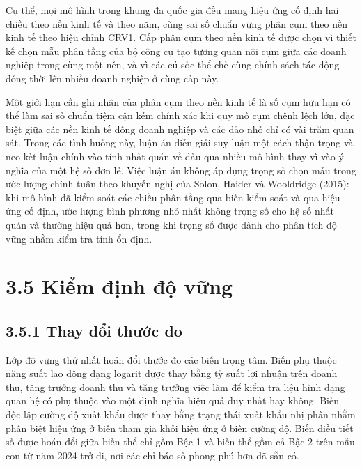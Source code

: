 \documentclass[
  a4paper,
  13pt]{extreport}
\begin{document}
Cụ thể, mọi mô hình trong khung đa quốc gia đều mang hiệu ứng cố định
hai chiều theo nền kinh tế và theo năm, cùng sai số chuẩn vững phân cụm
theo nền kinh tế theo hiệu chỉnh CRV1. Cấp phân cụm theo nền kinh tế
được chọn vì thiết kế chọn mẫu phân tầng của bộ công cụ tạo tương quan
nội cụm giữa các doanh nghiệp trong cùng một nền, và vì các cú sốc thể
chế cùng chính sách tác động đồng thời lên nhiều doanh nghiệp ở cùng cấp
này.

Một giới hạn cần ghi nhận của phân cụm theo nền kinh tế là số cụm hữu
hạn có thể làm sai số chuẩn tiệm cận kém chính xác khi quy mô cụm chênh
lệch lớn, đặc biệt giữa các nền kinh tế đông doanh nghiệp và các đảo nhỏ
chỉ có vài trăm quan sát. Trong các tình huống này, luận án diễn giải
suy luận một cách thận trọng và neo kết luận chính vào tính nhất quán về
dấu qua nhiều mô hình thay vì vào ý nghĩa của một hệ số đơn lẻ. Việc
luận án không áp dụng trọng số chọn mẫu trong ước lượng chính tuân theo
khuyến nghị của Solon, Haider và Wooldridge (2015): khi mô hình đã kiểm
soát các chiều phân tầng qua biến kiểm soát và qua hiệu ứng cố định, ước
lượng bình phương nhỏ nhất không trọng số cho hệ số nhất quán và thường
hiệu quả hơn, trong khi trọng số được dành cho phân tích độ vững nhằm
kiểm tra tính ổn định.

\hypertarget{kiux1ec3m-ux111ux1ecbnh-ux111ux1ed9-vux1eefng}{%
\section{3.5 Kiểm định độ
vững}\label{kiux1ec3m-ux111ux1ecbnh-ux111ux1ed9-vux1eefng}}

\hypertarget{thay-ux111ux1ed5i-thux1b0ux1edbc-ux111o}{%
\subsection{3.5.1 Thay đổi thước
đo}\label{thay-ux111ux1ed5i-thux1b0ux1edbc-ux111o}}

Lớp độ vững thứ nhất hoán đổi thước đo các biến trọng tâm. Biến phụ
thuộc năng suất lao động dạng logarit được thay bằng tỷ suất lợi nhuận
trên doanh thu, tăng trưởng doanh thu và tăng trưởng việc làm để kiểm
tra liệu hình dạng quan hệ có phụ thuộc vào một định nghĩa hiệu quả duy
nhất hay không. Biến độc lập cường độ xuất khẩu được thay bằng trạng
thái xuất khẩu nhị phân nhằm phân biệt hiệu ứng ở biên tham gia khỏi
hiệu ứng ở biên cường độ. Biến điều tiết số được hoán đổi giữa biến thể
chỉ gồm Bậc 1 và biến thể gồm cả Bậc 2 trên mẫu con từ năm 2024 trở đi,
nơi các chỉ báo số phong phú hơn đã sẵn có.
\end{document}
